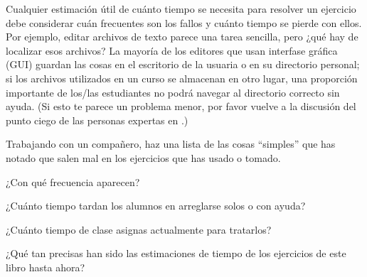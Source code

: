 Cualquier estimación útil de cuánto tiempo se necesita para resolver un ejercicio 
debe considerar cuán  frecuentes son los fallos y cuánto tiempo se pierde con ellos.
Por ejemplo, 
editar archivos de texto parece una tarea sencilla, 
pero ¿qué hay de localizar esos archivos?
La mayoría de los editores que usan interfase gráfica (GUI) guardan las cosas en el escritorio de la usuaria o en su directorio personal; si los archivos utilizados en un curso se almacenan en otro lugar, una proporción importante de los/las estudiantes no podrá navegar al directorio correcto sin ayuda.
(Si esto te parece un problema menor, por favor vuelve a la discusión del punto ciego de las personas expertas en .)


Trabajando con un compañero, haz una lista de las cosas ``simples'' que has notado que salen mal en los ejercicios que has usado o tomado.

¿Con qué frecuencia aparecen?

¿Cuánto tiempo tardan los alumnos en arreglarse solos o con ayuda?

¿Cuánto tiempo de clase asignas actualmente para tratarlos?


¿Qué tan precisas han sido las estimaciones de tiempo de los ejercicios de este libro hasta ahora?
